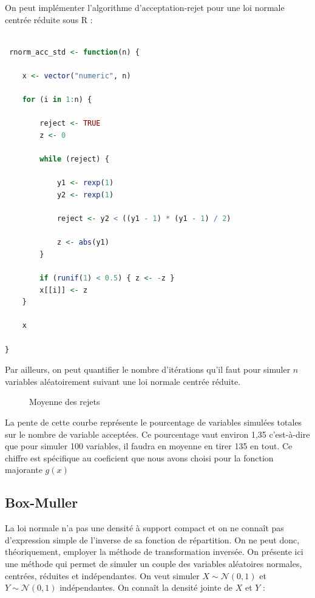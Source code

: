 \documentclass[10pt]{article} %
\begin{document}
On peut  implémenter l'algorithme d'acceptation-rejet pour une loi normale centrée réduite sous R :
\begin{lstlisting}[language=R]

 rnorm_acc_std <- function(n) {

    x <- vector("numeric", n)

    for (i in 1:n) {

        reject <- TRUE
        z <- 0

        while (reject) {

            y1 <- rexp(1)
            y2 <- rexp(1)

            reject <- y2 < ((y1 - 1) * (y1 - 1) / 2)

            z <- abs(y1)
        }

        if (runif(1) < 0.5) { z <- -z }
        x[[i]] <- z
    }

    x

}

\end{lstlisting}











 Par ailleurs, on peut quantifier le nombre d'itérations qu'il faut pour simuler $n$ variables aléatoirement suivant une loi normale centrée réduite.

\begin{figure}[h!]
    \centering
    
    \caption{Moyenne des rejets}
\end{figure}


La pente de cette courbe représente le pourcentage de variables simulées totales sur le nombre de variable acceptées. Ce pourcentage vaut environ 1,35 c'est-à-dire que pour simuler 100 variables, il faudra en moyenne en tirer 135 en tout. Ce chiffre est spécifique au coeficient que nous avons choisi pour la fonction majorante $g(x)$



\subsection{Box-Muller}

La loi normale n’a pas une densité à support compact et on ne connaît pas d’expression simple de l’inverse de sa
fonction de répartition. On ne peut donc, théoriquement, employer la méthode de transformation inversée. On présente
ici une méthode qui permet de simuler un couple des variables aléatoires normales, centrées, réduites et indépendantes.
On veut simuler $X \sim \mathcal{N} (0, 1)$ et $Y \sim \mathcal{N} (0, 1)$ indépendantes. On connaît la densité jointe de $X$ et
 $Y$ :
\end{document}
